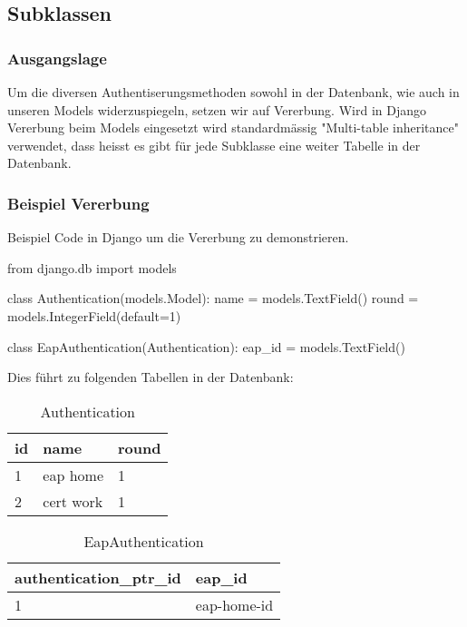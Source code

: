\subsection{Subklassen}
\subsubsection{Ausgangslage}
Um die diversen Authentiserungsmethoden sowohl in der Datenbank, wie auch in unseren Models widerzuspiegeln, setzen wir auf Vererbung. Wird in Django Vererbung beim Models eingesetzt wird standardmässig "Multi-table inheritance" verwendet, dass heisst es gibt für jede Subklasse eine weiter Tabelle in der Datenbank.

\subsubsection{Beispiel Vererbung}
Beispiel Code in Django um die Vererbung zu demonstrieren.
\medskip
\begin{python}
from django.db import models

class Authentication(models.Model):
    name = models.TextField()
    round = models.IntegerField(default=1)

class EapAuthentication(Authentication):
    eap_id = models.TextField()
\end{python}

\medskip
Dies führt zu folgenden Tabellen in der Datenbank:
\medskip

\begin{table}[H]
	\centering
    \begin{tabular}{|p{3cm}|p{3cm}|p{3cm}|}
    \hline    
    \rowcolor{lightblue}
	id & name & round \\ \hline   
	1 & eap home & 1 \\ \hline
	2 & cert work & 1 \\ \hline
    \end{tabular}
    \caption[Authentication]{Authentication}
\end{table}
\medskip \medskip
\begin{table}[H]
	\centering
    \begin{tabular}{|p{4.5cm}|p{4.5cm}|}
    \hline    
    \rowcolor{lightblue}
	authentication\_ptr\_id & eap\_id \\ \hline   
	1 & eap-home-id  \\ \hline
    \end{tabular}
    \caption[EapAuthentication]{EapAuthentication}
\end{table}
\medskip

